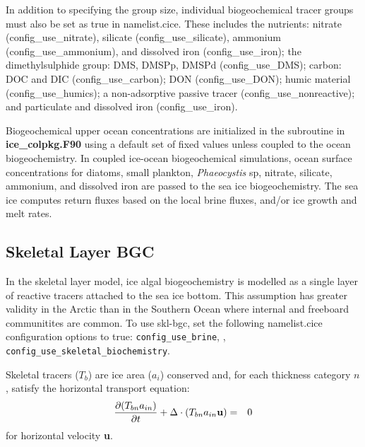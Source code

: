 In addition to specifying the group size, individual biogeochemical
tracer groups must also be set as true in namelist.cice.
These includes the nutrients: nitrate (config\_use\_nitrate), silicate
(config\_use\_silicate), ammonium (config\_use\_ammonium), and
dissolved iron (config\_use\_iron);  the dimethylsulphide group: DMS, DMSPp,
DMSPd (config\_use\_DMS); carbon: DOC and DIC (config\_use\_carbon);
DON (config\_use\_DON);
humic material (config\_use\_humics); a non-adsorptive passive tracer
(config\_use\_nonreactive); and particulate and dissolved iron (config\_use\_iron).

Biogeochemical upper ocean concentrations are initialized in the
subroutine 
in {\bf ice\_colpkg.F90} using a default set of fixed values unless
coupled to the ocean biogeochemistry. In coupled ice-ocean
biogeochemical simulations, ocean surface concentrations for diatoms,
small plankton, {\it Phaeocystis} sp, nitrate, silicate, ammonium, and
dissolved iron are passed to the sea ice biogeochemistry.  The sea ice
computes return fluxes based on the local brine fluxes, and/or ice growth
and melt rates.

\subsection{Skeletal Layer BGC}

In the skeletal layer model, ice algal biogeochemistry is modelled as a single layer
of reactive tracers attached to the sea ice bottom. This assumption
has greater validity in the Arctic than in the Southern Ocean where internal
and freeboard communitites are common.
To use skl-bgc, set the following namelist.cice configuration options
to true: {\tt config\_use\_brine}, ,
{\tt config\_use\_skeletal\_biochemistry}.

Skeletal tracers ($T_{b}$) are ice area ($a_{i}$) conserved
and, for each thickness category $n$, satisfy the horizontal transport equation:
\begin{eqnarray}
\label{eqn:bgc_tracer_thickness_cons}
\frac{\partial (T_{bn} a_{in})}{\partial t} + \Delta \cdot (T_{bn} a_{in} {\bf u}) & = & 0
\end{eqnarray}
for horizontal velocity {\bf u}.

